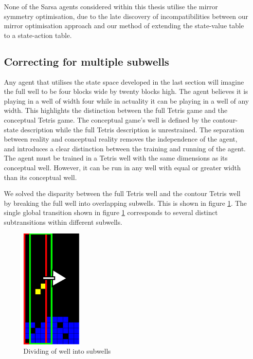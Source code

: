 \documentclass{rucsthesis}
\begin{document}
None of the Sarsa agents considered within this thesis utilise the mirror symmetry optimisation, due to the late discovery of incompatibilities between our mirror optimisation approach and our method of extending the state-value table to a state-action table.

 
\subsection{Correcting for multiple subwells \label{corsub}}

Any agent that utilises the state space developed in the last section will imagine the full well to be four blocks wide by twenty blocks high.  The agent believes it is playing in a well of width four while in actuality it can be playing in a well of any width. This highlights the distinction between the full Tetris game and the conceptual Tetris game. The conceptual game's well is defined by the contour-state description while the full Tetris description is unrestrained. The separation between reality and conceptual reality removes the independence of the agent, and introduces a clear distinction between the training and running of the agent. The agent must be trained in a Tetris well with the same dimensions as its conceptual well. However, it can be run in any well with equal or greater width than its conceptual well.

We solved the disparity between the full Tetris well and the contour Tetris well by breaking the full well into overlapping subwells. This is shown in figure \ref{fig:subwells}. The single global transition shown in figure \ref{fig:subwells} corresponds to several distinct subtransitions within different subwells.

\begin{figure}[h]
\centering
\includegraphics[width=1.2in]{decomposedwell.png}
\caption{Dividing of well into subwells}
\label{fig:subwells}
\end{figure}
\end{document}
